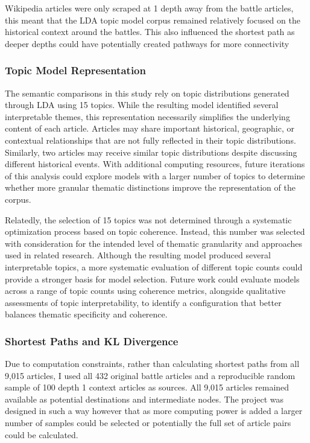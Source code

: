 \documentclass[
  letterpaper,
  DIV=11,
  numbers=noendperiod]{scrartcl}
\begin{document}
Wikipedia articles were only scraped at 1 depth away from the battle
articles, this meant that the LDA topic model corpus remained relatively
focused on the historical context around the battles. This also
influenced the shortest path as deeper depths could have potentially
created pathways for more connectivity

\subsubsection{Topic Model
Representation}\label{topic-model-representation}

The semantic comparisons in this study rely on topic distributions
generated through LDA using 15 topics. While the resulting model
identified several interpretable themes, this representation necessarily
simplifies the underlying content of each article. Articles may share
important historical, geographic, or contextual relationships that are
not fully reflected in their topic distributions. Similarly, two
articles may receive similar topic distributions despite discussing
different historical events. With additional computing resources, future
iterations of this analysis could explore models with a larger number of
topics to determine whether more granular thematic distinctions improve
the representation of the corpus.

Relatedly, the selection of 15 topics was not determined through a
systematic optimization process based on topic coherence. Instead, this
number was selected with consideration for the intended level of
thematic granularity and approaches used in related research. Although
the resulting model produced several interpretable topics, a more
systematic evaluation of different topic counts could provide a stronger
basis for model selection. Future work could evaluate models across a
range of topic counts using coherence metrics, alongside qualitative
assessments of topic interpretability, to identify a configuration that
better balances thematic specificity and coherence.

\subsubsection{Shortest Paths and KL
Divergence}\label{shortest-paths-and-kl-divergence}

Due to computation constraints, rather than calculating shortest paths
from all 9,015 articles, I used all 432 original battle articles and a
reproducible random sample of 100 depth 1 context articles as sources.
All 9,015 articles remained available as potential destinations and
intermediate nodes. The project was designed in such a way however that
as more computing power is added a larger number of samples could be
selected or potentially the full set of article pairs could be
calculated.
\end{document}
